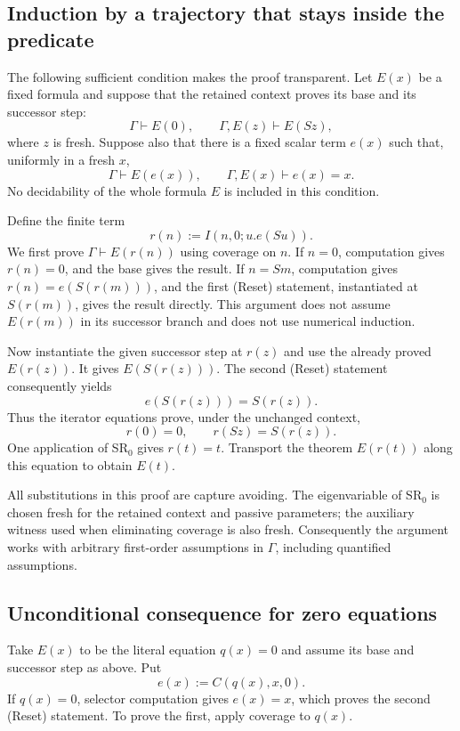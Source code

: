 \subsection{Induction by a trajectory that stays inside the predicate}

The following sufficient condition makes the proof transparent.  Let
$E(x)$ be a fixed formula and suppose that the retained context proves
its base and its successor step:
\[
 \Gamma\vdash E(0),\qquad
 \Gamma,E(z)\vdash E(Sz),
\]
where $z$ is fresh.  Suppose also that there is a fixed scalar term
$e(x)$ such that, uniformly in a fresh $x$,
\[
 \Gamma\vdash E(e(x)),\qquad
 \Gamma,E(x)\vdash e(x)=x.                         \tag{Reset}
\]
No decidability of the whole formula $E$ is included in this condition.

Define the finite term
\[
                     r(n):=I(n,0;u.e(Su)).
\]
We first prove $\Gamma\vdash E(r(n))$ using coverage on $n$.
If $n=0$, computation gives $r(n)=0$, and the base gives the result.
If $n=Sm$, computation gives $r(n)=e(S(r(m)))$, and the first
\textnormal{(Reset)} statement, instantiated at $S(r(m))$, gives the
result directly.  This argument does not assume $E(r(m))$ in its
successor branch and does not use numerical induction.

Now instantiate the given successor step at $r(z)$ and use the
already proved $E(r(z))$.  It gives $E(S(r(z)))$.  The second
\textnormal{(Reset)} statement consequently yields
\[
 e(S(r(z)))=S(r(z)).
\]
Thus the iterator equations prove, under the unchanged context,
\[
                   r(0)=0,\qquad r(Sz)=S(r(z)).
\]
One application of SR$_0$ gives $r(t)=t$.  Transport the theorem
$E(r(t))$ along this equation to obtain $E(t)$.

All substitutions in this proof are capture avoiding.  The eigenvariable
of SR$_0$ is chosen fresh for the retained context and passive parameters;
the auxiliary witness used when eliminating coverage is also fresh.
Consequently the argument works with arbitrary first-order assumptions
in $\Gamma$, including quantified assumptions.

\subsection{Unconditional consequence for zero equations}

Take $E(x)$ to be the literal equation $q(x)=0$ and assume its base
and successor step as above.  Put
\[
                       e(x):=C(q(x),x,0).
\]
If $q(x)=0$, selector computation gives $e(x)=x$, which proves the
second \textnormal{(Reset)} statement.  To prove the first, apply
coverage to $q(x)$.

